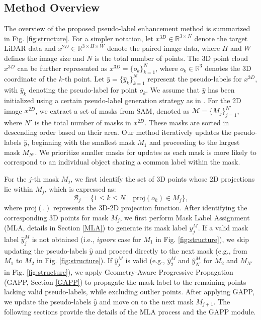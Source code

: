 \figProp

\subsection{Method Overview}
The overview of the proposed pseudo-label enhancement method is summarized in Fig. \ref{fig:structure}. For a simpler notation, let $x^{3D} \in \mathbb{R}^{3\times N}$ denote the target LiDAR data and $x^{2D} \in \mathbb{R}^{3\times H \times W}$ denote the paired image data, where $H$ and $W$ defines the image size and $N$ is the total number of points. The 3D point cloud $x^{3D}$ can be further represented as $x^{3D} = \{o_k\}_{k=1}^{N}$, where $o_k \in \mathbb{R}^3$ denotes the 3D coordinate of the $k$-th point. Let $\hat{y} = \{\hat{y}_k\}_{k=1}^{N} $ represent the pseudo-labels for $x^{3D}$, with $\hat{y}_k$ denoting the pseudo-label for point $o_k$. We assume that $\hat{y}$ has been initialized using a certain pseudo-label generation strategy as in \cite{jaritz2020xmuda, simons2023summit}. For the 2D image $x^{2D}$, we extract a set of masks from SAM, denoted as $\mathcal{M} = \{M_j\}_{j=1}^{N'}$, where $N'$ is the total number of masks in $x^{2D}$. These masks are sorted in descending order based on their area. Our method iteratively updates the pseudo-labels $\hat{y}$, beginning with the smallest mask $M_1$ and proceeding to the largest mask $M_{N'}$. We prioritize smaller masks for updates as each mask is more likely to correspond to an individual object sharing a common label within the mask.

For the $j$-th mask $M_j$, we first identify the set of 3D points whose 2D projections lie within $M_j$, which is expressed as:
\begin{equation}
\mathcal{B}_{j} = \{1 \leq k \leq N\ | \;\;  \text{proj}(o_k) \in M_j \},
\label{equ:getpoints}
\end{equation}
where $\text{proj}(.)$ represents the 3D-2D projection function. After identifying the corresponding 3D points for mask $M_j$, we first perform Mask Label Assignment (MLA, details in Section \ref{MLA}) to generate its mask label $\hat{y}^M_{j}$. If a valid mask label $\hat{y}^M_{j}$ is not obtained (i.e., \textit{ignore} case for $M_{1}$ in Fig. \ref{fig:structure}), we skip updating the pseudo-labels $\hat{y}$ and proceed directly to the next mask (e.g., from $M_1$ to $M_2$ in Fig. \ref{fig:structure}). If $\hat{y}^M_{j}$ is valid (e.g., $\hat{y}^M_{2}$ and $\hat{y}^M_{N'}$ for $M_2$ and $M_{N'}$ in Fig. \ref{fig:structure}), we apply Geometry-Aware Progressive Propagation (GAPP, Section \ref{GAPP}) to propagate the mask label to the remaining points lacking valid pseudo-labels, while excluding outlier points. After applying GAPP, we update the pseudo-labels $\hat{y}$ and move on to the next mask $M_{j+1}$. The following sections provide the details of the MLA process and the GAPP module.

